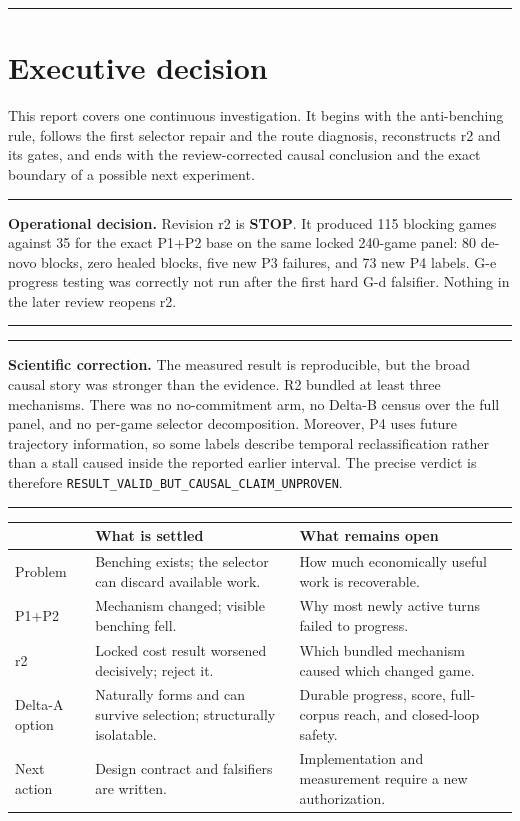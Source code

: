 \documentclass[10pt,a4paper]{article}
\newcommand{\code}[1]{\texttt{#1}}
\newcommand{\stopmark}{\textcolor{bad}{\textbf{STOP}}}
\newenvironment{GreenBox}
  {\par\medskip\noindent\begin{minipage}{\textwidth}\color{good}\hrule height 1.1pt\vspace{5pt}\color{ink}}
  {\vspace{2pt}\color{good}\hrule height 1.1pt\end{minipage}\par\medskip}
\newenvironment{RedBox}
  {\par\medskip\noindent\begin{minipage}{\textwidth}\color{bad}\hrule height 1.1pt\vspace{5pt}\color{ink}}
  {\vspace{2pt}\color{bad}\hrule height 1.1pt\end{minipage}\par\medskip}
\begin{document}
\vspace{8mm}
{\color{accent}\rule{\textwidth}{2.2pt}}
\newpage

\tableofcontents
\newpage

\section{Executive decision}

This report covers one continuous investigation. It begins with the anti-benching rule, follows
the first selector repair and the route diagnosis, reconstructs r2 and its gates, and ends with the
review-corrected causal conclusion and the exact boundary of a possible next experiment.

\begin{RedBox}
\textbf{Operational decision.} Revision r2 is \stopmark. It produced 115 blocking games against 35
for the exact P1+P2 base on the same locked 240-game panel: 80 de-novo blocks, zero healed blocks,
five new P3 failures, and 73 new P4 labels. G-e progress testing was correctly not run after the
first hard G-d falsifier. Nothing in the later review reopens r2.
\end{RedBox}

\begin{GreenBox}
\textbf{Scientific correction.} The measured result is reproducible, but the broad causal story
was stronger than the evidence. R2 bundled at least three mechanisms. There was no no-commitment
arm, no Delta-B census over the full panel, and no per-game selector decomposition. Moreover, P4
uses future trajectory information, so some labels describe temporal reclassification rather than
a stall caused inside the reported earlier interval. The precise verdict is therefore
\code{RESULT\_VALID\_BUT\_CAUSAL\_CLAIM\_UNPROVEN}.
\end{GreenBox}

\begin{tabularx}{\textwidth}{@{}p{31mm}Y Y@{}}
\toprule
& \textbf{What is settled} & \textbf{What remains open} \\
\midrule
Problem & Benching exists; the selector can discard available work. & How much economically useful work is recoverable. \\
P1+P2 & Mechanism changed; visible benching fell. & Why most newly active turns failed to progress. \\
r2 & Locked cost result worsened decisively; reject it. & Which bundled mechanism caused which changed game. \\
Delta-A option & Naturally forms and can survive selection; structurally isolatable. & Durable progress, score, full-corpus reach, and closed-loop safety. \\
Next action & Design contract and falsifiers are written. & Implementation and measurement require a new authorization. \\
\bottomrule
\end{tabularx}
\end{document}
